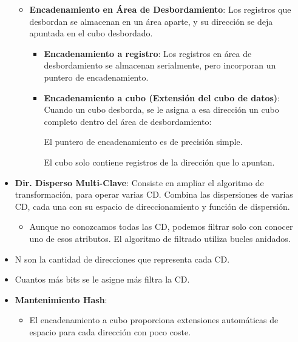 \documentclass[12pt, twoside, openright]{report} %
\begin{document}
\begin{itemize}
\begin{itemize}
\begin{itemize}
        \end{itemize}
      \item \textbf{Encadenamiento en Área de Desbordamiento}: Los registros
        que desbordan se almacenan en un área aparte, y su dirección se
        deja apuntada en el cubo desbordado.
        

        \begin{itemize}
        \item \textbf{Encadenamiento a registro}: Los registros en área de
          desbordamiento se almacenan serialmente, pero incorporan un
          puntero de encadenamiento.
          
        \item \textbf{Encadenamiento a cubo (Extensión del cubo de datos)}:
          Cuando un cubo desborda, se le asigna a esa dirección un cubo
          completo dentro del área de desbordamiento:
          

         
            El puntero de encadenamiento es de precisión simple.
           
			
            El cubo solo contiene registros de la dirección que lo
            apuntan.
       
        \end{itemize}
      \end{itemize}
    \item \textbf{Dir. Disperso Multi-Clave}: Consiste en ampliar el
      algoritmo de transformación, para operar varias CD. Combina las
      dispersiones de varias CD, cada una con su espacio de
      direccionamiento y función de dispersión.
      

      \begin{itemize}
      \item Aunque no conozcamos todas las CD, podemos filtrar solo con
        conocer uno de esos atributos. El algoritmo de filtrado utiliza
        bucles anidados.
        
      \end{itemize}
    \item N son la cantidad de direcciones que representa cada CD.
      
    \item Cuantos más bits se le asigne más filtra la CD.
      
    \item \textbf{Mantenimiento Hash}:
      

      \begin{itemize}
      \item El encadenamiento a cubo proporciona extensiones automáticas de
        espacio para cada dirección con poco coste.
        

\end{itemize}
\end{itemize}
\end{document}
